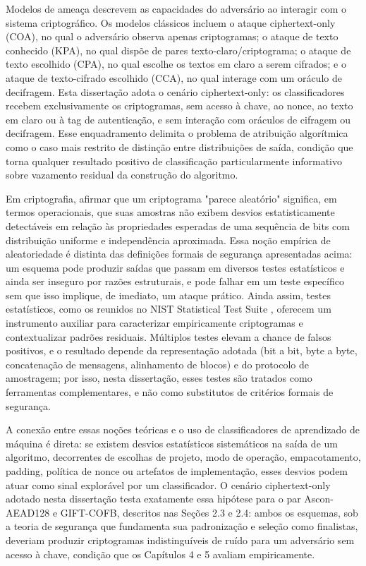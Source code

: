 Modelos de ameaça descrevem as capacidades do adversário ao interagir com o sistema criptográfico. Os modelos clássicos incluem o ataque ciphertext-only (COA), no qual o adversário observa apenas criptogramas; o ataque de texto conhecido (KPA), no qual dispõe de pares texto-claro/criptograma; o ataque de texto escolhido (CPA), no qual escolhe os textos em claro a serem cifrados; e o ataque de texto-cifrado escolhido (CCA), no qual interage com um oráculo de decifragem. Esta dissertação adota o cenário ciphertext-only: os classificadores recebem exclusivamente os criptogramas, sem acesso à chave, ao nonce, ao texto em claro ou à tag de autenticação, e sem interação com oráculos de cifragem ou decifragem. Esse enquadramento delimita o problema de atribuição algorítmica como o caso mais restrito de distinção entre distribuições de saída, condição que torna qualquer resultado positivo de classificação particularmente informativo sobre vazamento residual da construção do algoritmo.

Em criptografia, afirmar que um criptograma "parece aleatório" significa, em termos operacionais, que suas amostras não exibem desvios estatisticamente detectáveis em relação às propriedades esperadas de uma sequência de bits com distribuição uniforme e independência aproximada. Essa noção empírica de aleatoriedade é distinta das definições formais de segurança apresentadas acima: um esquema pode produzir saídas que passam em diversos testes estatísticos e ainda ser inseguro por razões estruturais, e pode falhar em um teste específico sem que isso implique, de imediato, um ataque prático. Ainda assim, testes estatísticos, como os reunidos no NIST Statistical Test Suite \cite{Rukhin2010NIST80022}, oferecem um instrumento auxiliar para caracterizar empiricamente criptogramas e contextualizar padrões residuais. Múltiplos testes elevam a chance de falsos positivos, e o resultado depende da representação adotada (bit a bit, byte a byte, concatenação de mensagens, alinhamento de blocos) e do protocolo de amostragem; por isso, nesta dissertação, esses testes são tratados como ferramentas complementares, e não como substitutos de critérios formais de segurança.

A conexão entre essas noções teóricas e o uso de classificadores de aprendizado de máquina é direta: se existem desvios estatísticos sistemáticos na saída de um algoritmo, decorrentes de escolhas de projeto, modo de operação, empacotamento, padding, política de nonce ou artefatos de implementação, esses desvios podem atuar como sinal explorável por um classificador. O cenário ciphertext-only adotado nesta dissertação testa exatamente essa hipótese para o par Ascon-AEAD128 e GIFT-COFB, descritos nas Seções 2.3 e 2.4: ambos os esquemas, sob a teoria de segurança que fundamenta sua padronização e seleção como finalistas, deveriam produzir criptogramas indistinguíveis de ruído para um adversário sem acesso à chave, condição que os Capítulos 4 e 5 avaliam empiricamente.




